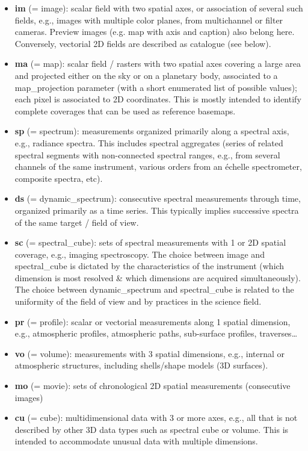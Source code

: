 \documentclass[11pt,a4paper]{ivoa}
\begin{document}
\begin{itemize}
\item \textbf{im }(= image): scalar field with two spatial axes, or association of several such fields, e.g., images with multiple color planes, from multichannel or filter cameras. Preview images (e.g. map with axis and caption) also belong here. Conversely, vectorial 2D fields are described as catalogue (see below).
\item \textbf{ma }(= map): scalar field / rasters with two spatial axes covering a large area and projected either on the sky or on a planetary body, associated to a map\_projection parameter (with a short enumerated list of possible values); each pixel is associated to 2D coordinates. This is mostly intended to identify complete coverages that can be used as reference basemaps. 
\item \textbf{sp }(= spectrum): measurements organized primarily along a spectral axis, e.g., radiance spectra. This includes spectral aggregates (series of related spectral segments with non-connected spectral ranges, e.g., from several channels of the same instrument, various orders from an échelle spectrometer, composite spectra, etc).
\item \textbf{ds }(= dynamic\_spectrum): consecutive spectral measurements through time, organized primarily as a time series. This typically implies successive spectra of the same target / field of view.
\item \textbf{sc }(= spectral\_cube): sets of spectral measurements with 1 or 2D spatial coverage, e.g., imaging spectroscopy. The choice between image and spectral\_cube is dictated by the characteristics of the instrument (which dimension is most resolved \& which dimensions are acquired simultaneously). The choice between dynamic\_spectrum and spectral\_cube is related to the uniformity of the field of view and by practices in the science field.
\item \textbf{pr }(= profile): scalar or vectorial measurements along 1 spatial dimension, e.g., atmospheric profiles, atmospheric paths, sub-surface profiles, traverses…
\item \textbf{vo }(= volume): measurements with 3 spatial dimensions, e.g., internal or atmospheric structures, including shells/shape models (3D surfaces).
\item \textbf{mo }(= movie): sets of chronological 2D spatial measurements (consecutive images)
\item \textbf{cu }(= cube): multidimensional data with 3 or more axes, e.g., all that is not described by other 3D data types such as spectral cube or volume. This is intended to accommodate unusual data with multiple dimensions.

\end{itemize}
\end{document}
